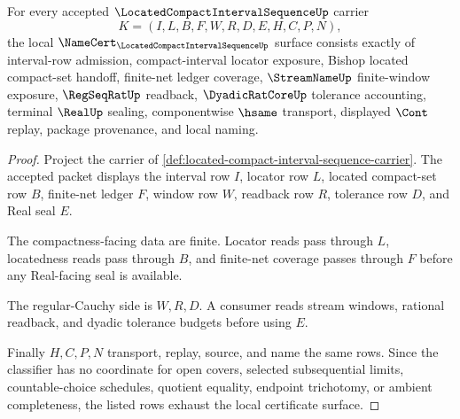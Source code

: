 \begin{theorem}
\label{thm:located-compact-interval-sequence-obligations}
For every accepted $\LocatedCompactIntervalSequenceUp$ carrier
$$
K=(I,L,B,F,W,R,D,E,H,C,P,N),
$$
the local $\NameCert_{\LocatedCompactIntervalSequenceUp}$ surface consists exactly of interval-row admission, compact-interval locator exposure, Bishop located compact-set handoff, finite-net ledger coverage, $\StreamNameUp$ finite-window exposure, $\RegSeqRatUp$ readback, $\DyadicRatCoreUp$ tolerance accounting, terminal $\RealUp$ sealing, componentwise $\hsame$ transport, displayed $\Cont$ replay, package provenance, and local naming.
\end{theorem}
\begin{proof}
Project the carrier of \autoref{def:located-compact-interval-sequence-carrier}. The accepted packet displays the interval row $I$, locator row $L$, located compact-set row $B$, finite-net ledger $F$, window row $W$, readback row $R$, tolerance row $D$, and Real seal $E$.

The compactness-facing data are finite. Locator reads pass through $L$, locatedness reads pass through $B$, and finite-net coverage passes through $F$ before any Real-facing seal is available.

The regular-Cauchy side is $W,R,D$. A consumer reads stream windows, rational readback, and dyadic tolerance budgets before using $E$.

Finally $H,C,P,N$ transport, replay, source, and name the same rows. Since the classifier has no coordinate for open covers, selected subsequential limits, countable-choice schedules, quotient equality, endpoint trichotomy, or ambient completeness, the listed rows exhaust the local certificate surface.
\end{proof}

